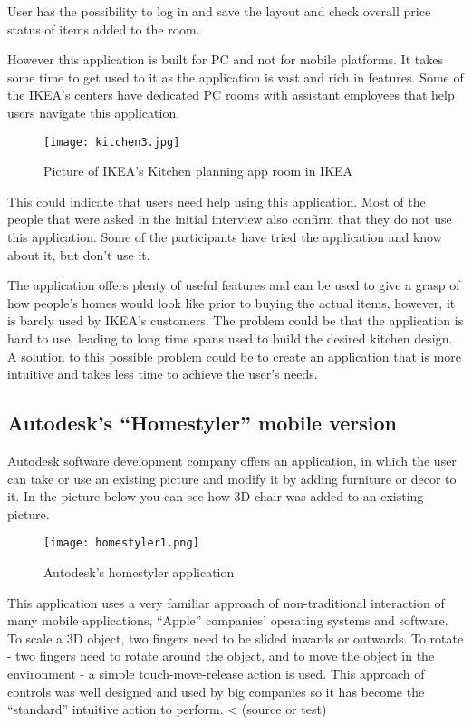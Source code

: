 User has the possibility to log in and save the layout and check overall price status of items added to the room.

However this application is built for PC and not for mobile platforms. It takes some time to get used to it as the application is vast and rich in features. Some of the IKEA’s centers have dedicated PC rooms with assistant employees that help users navigate this application. 

\begin{figure}[H]
\centering
\texttt{[image: kitchen3.jpg]}
\caption{Picture of IKEA’s Kitchen planning app room in IKEA}
\end{figure}


This could indicate that users need help using this application. Most of the people that were asked in the initial interview also confirm that they do not use this application. Some of the participants have tried the application and know about it, but don’t use it.

The application offers plenty of useful features and can be used to give a grasp of how people’s homes would look like prior to buying the actual items, however, it is barely used by IKEA’s customers. The problem could be that the application is hard to use, leading to long time spans used to build the desired kitchen design. A solution to this possible problem could be to create an application that is more intuitive and takes less time to achieve the user’s needs.

\subsection{Autodesk’s “Homestyler” mobile version}

Autodesk software development company offers an application, in which the user can take or use an existing picture and modify it by adding furniture or decor to it. In the picture below you can see how 3D chair was added to an existing picture.  

\begin{figure}[H]
\centering
\texttt{[image: homestyler1.png]}
\caption{Autodesk's homestyler application}
\end{figure}

This application uses a very familiar approach of non-traditional interaction of many mobile applications, “Apple” companies’ operating systems and software. To scale a 3D object, two fingers need to be slided inwards or outwards. To rotate - two fingers need to rotate around the object, and to move the object in the environment - a simple touch-move-release action is used. This approach of controls was well designed and used by big companies so it has become the “standard” intuitive action to perform. < (source or test)

